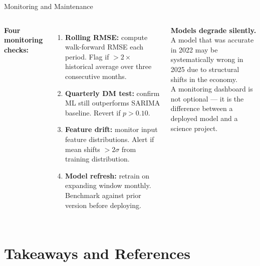 \documentclass[aspectratio=169, 10pt]{beamer}
\begin{document}
\begin{frame}{Monitoring and Maintenance}
  \begin{columns}[T]
      \textbf{Four monitoring checks:}
      \begin{enumerate}\small\setlength{\itemsep}{4pt}
        \item \textbf{Rolling RMSE:} compute walk-forward
              RMSE each period. Flag if $> 2\times$ historical
              average over three consecutive months.
        \item \textbf{Quarterly DM test:} confirm ML still
              outperforms SARIMA baseline. Revert if $p > 0.10$.
        \item \textbf{Feature drift:} monitor input feature
              distributions. Alert if mean shifts $> 2\sigma$
              from training distribution.
        \item \textbf{Model refresh:} retrain on expanding
              window monthly. Benchmark against prior version
              before deploying.
      \end{enumerate}
      \begin{warningbox}
        {\small \textbf{Models degrade silently.}\\[3pt]
        A model that was accurate in 2022 may
        be systematically wrong in 2025 due to
        structural shifts in the economy.\\[3pt]
        A monitoring dashboard is not optional
        --- it is the difference between a
        deployed model and a science project.}
      \end{warningbox}
  \end{columns}
\end{frame}

\section{Takeaways and References}

\end{document}
